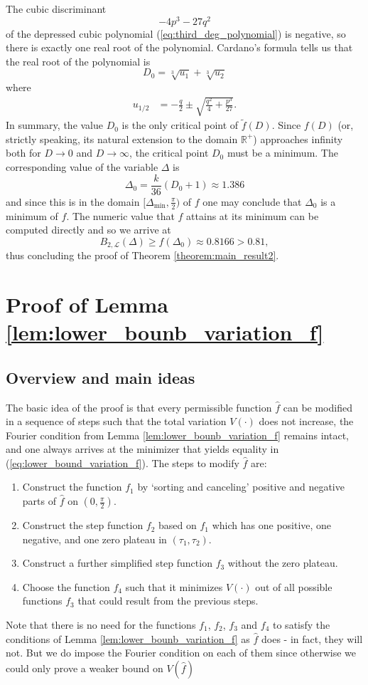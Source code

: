 \documentclass{article}
\newcommand{\R}{\mathbb{R}\xspace}
\begin{document}
The cubic discriminant 
\[-4p^3 - 27q^2\]
of the depressed cubic polynomial (\ref{eq:third_deg_polynomial}) is negative, so there is exactly one real root of the polynomial.
Cardano's formula tells us that the real root of the polynomial is
\[D_0 = \sqrt[3]{u_1}+\sqrt[3]{u_2}\]
where
\begin{align*}
    u_{1/2} &= -\frac q2 \pm\sqrt{\frac{q^2}4+\frac{p^3}{27}}.
\end{align*}
In summary, the value $D_0$ is the only critical point of $\tilde f(D)$. Since $f(D)$ (or, strictly speaking, its natural extension to the domain $\R^+$) approaches infinity both for $D \rightarrow 0$ and $D \rightarrow \infty$, the critical point $D_0$ must be a minimum.
The corresponding value of the variable $\Delta$ is
\[\Delta_0 = \frac{k}{36}(D_0 + 1) \approx 1.386\]
and since this is in the domain $[\Delta_{\text{min}},\frac\pi2)$ of $f$ one may conclude that $\Delta_0$ is a minimum of $f$.
The numeric value that $f$ attains at its minimum can be computed directly and so we arrive at
\[B_{2,\mathcal{L}}(\Delta) \ge f(\Delta_0) \approx 0.8166 > 0.81,\]
thus concluding the proof of Theorem \ref{theorem:main_result2}.

\section{Proof of Lemma \ref{lem:lower_bounb_variation_f}} \label{sec:proof_estimate_f}

\subsection{Overview and main ideas}

The basic idea of the proof is that every permissible function $\hat f$ can be modified in a sequence of steps such that the total variation $V(\cdot)$ does not increase, the Fourier condition from Lemma \ref{lem:lower_bounb_variation_f} remains intact, and one always arrives at the minimizer that yields equality in (\ref{eq:lower_bound_variation_f}). The steps to modify $\hat f$ are:
\begin{enumerate}
    \item Construct the function $f_1$ by `sorting and canceling' positive and negative parts of $\hat f$ on $(0, \frac\pi 2)$.
    \item Construct the step function $f_2$ based on $f_1$ which has one positive, one negative, and one zero plateau in $(\tau_1,\tau_2)$.
    \item Construct a further simplified step function $f_3$ without the zero plateau.
    \item Choose the function $f_4$ such that it minimizes $V(\cdot)$ out of all possible functions $f_3$ that could result from the previous steps.
\end{enumerate}
Note that there is no need for the functions $f_1$, $f_2$, $f_3$ and $f_4$ to satisfy the conditions of Lemma \ref{lem:lower_bounb_variation_f} as $\hat f$ does - in fact, they will not. But we do impose the Fourier condition on each of them since otherwise we could only prove a weaker bound on $V(\hat f)$
\end{document}
